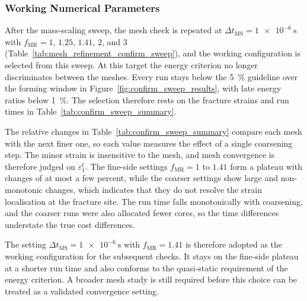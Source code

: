 \subsubsection{Working Numerical Parameters}
\label{sec:selection_numerical_parameters}

After the mass-scaling sweep, the mesh check is repeated at
$\Delta t_\mathrm{MS}=\SI{1e-6}{\second}$ with
$f_\mathrm{MR}=1$, $1.25$, $1.41$, $2$, and $3$
(Table~\ref{tab:mesh_refinement_confirm_sweep}), and the working configuration
is selected from this sweep. At this target the energy criterion no longer
discriminates between the meshes. Every run stays below the
\SI{5}{\percent} guideline over the forming window in
Figure~\ref{fig:confirm_sweep_results}, with late energy ratios below
\SI{1}{\percent}. The selection therefore rests on the fracture strains and
run times in Table~\ref{tab:confirm_sweep_summary}.

The relative changes in Table~\ref{tab:confirm_sweep_summary} compare each
mesh with the next finer one, so each value measures the effect of a single
coarsening step. The minor strain is insensitive to the mesh, and mesh
convergence is therefore judged on $\varepsilon_1^\mathrm{f}$. The fine-side
settings $f_\mathrm{MR}=1$ to $1.41$ form a plateau with changes of at most a
few percent, while the coarser settings show large and non-monotonic changes,
which indicates that they do not resolve the strain localisation at the
fracture site. The run time falls monotonically with coarsening, and the
coarser runs were also allocated fewer cores, so the time differences
understate the true cost differences.

The setting $\Delta t_\mathrm{MS}=\SI{1e-6}{\second}$ with
$f_\mathrm{MR}=1.41$ is therefore adopted as the working configuration for the
subsequent checks. It stays on the fine-side plateau at a shorter run time and
also conforms to the quasi-static requirement of the energy criterion. A
broader mesh study is still required before this choice can be treated as a
validated convergence setting.

